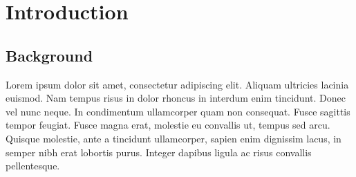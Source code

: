 
\chapter{Introduction} %

\label{ChapterX} %



\section{Background}

Lorem ipsum dolor sit amet, consectetur adipiscing elit. Aliquam ultricies lacinia euismod. Nam tempus risus in dolor rhoncus in interdum enim tincidunt. Donec vel nunc neque. In condimentum ullamcorper quam non consequat. Fusce sagittis tempor feugiat. Fusce magna erat, molestie eu convallis ut, tempus sed arcu. Quisque molestie, ante a tincidunt ullamcorper, sapien enim dignissim lacus, in semper nibh erat lobortis purus. Integer dapibus ligula ac risus convallis pellentesque.
